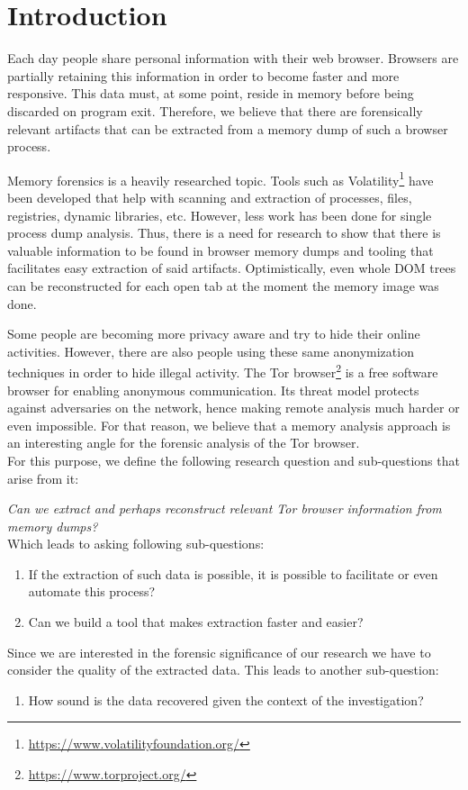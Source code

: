 \section{Introduction}
\label{sec:introduction}
Each day people share personal information with their web
browser. Browsers are partially retaining this information in order to
become faster and more responsive. This data must, at some point, reside
in memory before being discarded on program exit. Therefore, we
believe that there are forensically relevant artifacts that can be
extracted from a memory dump of such a browser process.

Memory forensics is a heavily researched topic. Tools such as
Volatility\footnote{\url{https://www.volatilityfoundation.org/}} have
been developed that help with scanning and extraction of processes,
files, registries, dynamic libraries, etc. However, less work has been
done for single process dump analysis. Thus, there is a need for
research to show that there is valuable information to be found in
browser memory dumps and tooling that facilitates easy extraction of
said artifacts. Optimistically, even whole DOM trees can be
reconstructed for each open tab at the moment the memory image was
done.

Some people are becoming more privacy aware and try to hide their
online activities. However, there are also people using these same
anonymization techniques in order to hide illegal activity. The Tor
browser\footnote{\url{https://www.torproject.org/}} is a free software
browser for enabling anonymous communication. Its threat model
protects against adversaries on the network, hence making remote
analysis much harder or even impossible. For that reason, we believe
that a memory analysis approach is an interesting angle for the
forensic analysis of the Tor browser.  \\

For this purpose, we define the following research question and
sub-questions that arise from it:

\textit{Can we extract and perhaps reconstruct relevant Tor browser
  information from memory dumps?}  \\

Which leads to asking following sub-questions:
\begin{enumerate}
\item If the extraction of such data is possible, it is possible to
  facilitate or even automate this process?
\item Can we build a tool that makes extraction faster and easier?
\end{enumerate}

Since we are interested in the forensic significance of our research
we have to consider the quality of the extracted data. This leads to
another sub-question:
\begin{enumerate}[resume]
\item How sound is the data recovered given the context of the
  investigation?
\end{enumerate}

